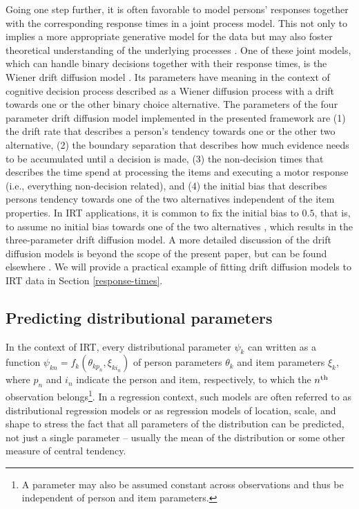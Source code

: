 \documentclass[jss]{jss}
\begin{document}
Going one step further, it is often favorable to model persons'
responses together with the corresponding response times in a joint
process model. This not only to implies a more appropriate generative
model for the data but may also foster theoretical understanding of the
underlying processes \citep{ratcliff1978, vandermaas2011}. One of these
joint models, which can handle binary decisions together with their
response times, is the Wiener drift diffusion model
\citep{ratcliff1978, vandermaas2011}. Its parameters have meaning in the
context of cognitive decision process described as a Wiener diffusion
process with a drift towards one or the other binary choice alternative.
The parameters of the four parameter drift diffusion model implemented
in the presented framework are (1) the drift rate that describes a
person's tendency towards one or the other two alternative, (2) the
boundary separation that describes how much evidence needs to be
accumulated until a decision is made, (3) the non-decision times that
describes the time spend at processing the items and executing a motor
response (i.e., everything non-decision related), and (4) the initial
bias that describes persons tendency towards one of the two alternatives
independent of the item properties. In IRT applications, it is common to
fix the initial bias to \(0.5\), that is, to assume no initial bias
towards one of the two alternatives \citep{diffIRT}, which results in
the three-parameter drift diffusion model. A more detailed discussion of
the drift diffusion models is beyond the scope of the present paper, but
can be found elsewhere \citep{ratcliff1978, vandermaas2011, diffIRT}. We
will provide a practical example of fitting drift diffusion models to
IRT data in Section \ref{response-times}.

\hypertarget{predDP}{%
\subsection{Predicting distributional parameters}\label{predDP}}

In the context of IRT, every distributional parameter \(\psi_k\) can
written as a function \(\psi_{kn} = f_k(\theta_{kp_n}, \xi_{ki_n})\) of
person parameters \(\theta_{k}\) and item parameters \(\xi_{k}\), where
\(p_n\) and \(i_n\) indicate the person and item, respectively, to which
the \(n\textsuperscript{th}\) observation
belongs\footnote{A parameter may also be assumed constant across observations
and thus be independent of person and item parameters.}. In a regression
context, such models are often referred to as distributional regression
models or as regression models of location, scale, and shape
\citep{rigby2005} to stress the fact that all parameters of the
distribution can be predicted, not just a single parameter -- usually
the mean of the distribution or some other measure of central tendency.
\end{document}
